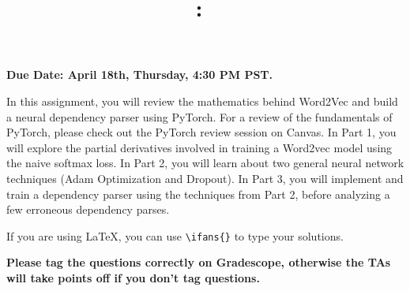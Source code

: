 \documentclass[answers]{exam}
\title{
\vspace{-1in}
\textmd{\textbf{\hmwkClass:\ \hmwkTitle}}
}
\author{}
\date{}
\newif\ifanswers
\newcommand{\ifans}[1]{\ifanswers \color{red} \textbf{Solution: } #1 \color{black} \fi}
\begin{document}
\maketitle
\vspace{-3em}

\textbf{Due Date: April 18th, Thursday, 4:30 PM PST.}

In this assignment, you will review the mathematics behind Word2Vec and build a neural dependency parser using PyTorch. For a review of the fundamentals of PyTorch, please check out the PyTorch review session on Canvas. In Part 1, you will explore the partial derivatives involved in training a Word2vec model using the naive softmax loss. In Part 2, you will learn about two general neural network techniques (Adam Optimization and Dropout). In Part 3, you will implement and train a dependency parser using the techniques from Part 2, before analyzing a few erroneous dependency parses.

If you are using LaTeX, you can use \verb!\ifans{}! to type your solutions.

\textbf{Please tag the questions correctly on Gradescope, otherwise the TAs will take points off if you don't tag questions.}
\begin{questions}
    
    \newpage
    
    \newpage
    
\end{questions}


\end{document}
